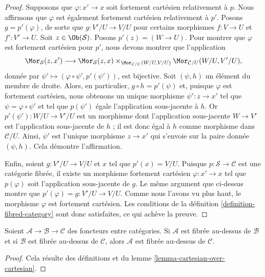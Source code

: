 \begin{proof}
Supposons que $\varphi : x' \to x$ soit fortement cartésien relativement
à $p$. Nous affirmons que $\varphi$ est également fortement cartésien
relativement à $p'$. Posons $g = p'(\varphi)$, de sorte que
$g : V'/U \to V/U$ pour certains morphismes $f : V \to U$ et
$f' : V' \to U$.
Soit $z \in \Ob(\mathcal{S})$. Posons $p'(z) = (W \to U)$.
Pour montrer que $\varphi$ est fortement cartésien pour $p'$, nous devons
montrer que l'application
$$
\Mor_\mathcal{S}(z, x')
\longrightarrow
\Mor_\mathcal{S}(z, x)
\times_{\Mor_{\mathcal{C}/U}(W/U, V/U)}
\Mor_{\mathcal{C}/U}(W/U, V'/U),
$$
donnée par $\psi' \longmapsto (\varphi \circ \psi', p'(\psi'))$,
est bijective. Soit $(\psi, h)$ un élément du membre de droite. Alors, en
particulier, $g \circ h = p'(\psi)$ et, puisque $\varphi$ est fortement
cartésien, nous obtenons un unique morphisme $\psi' : z \to x'$ tel que
$\psi = \varphi \circ \psi'$ et tel que $p(\psi')$ égale l'application
sous-jacente à $h$. Or $p'(\psi') : W/U \to V'/U$ est un morphisme
dont l'application sous-jacente $W \to V'$ est l'application sous-jacente
de $h$ ; il est donc égal à $h$ comme morphisme dans $\mathcal{C}/U$.
Ainsi, $\psi'$ est l'unique morphisme $z \to x'$ qui s'envoie sur la paire
donnée $(\psi, h)$. Cela démontre l'affirmation.

\medskip\noindent
Enfin, soient $g : V'/U \to V/U$ et $x$ tel que $p'(x) = V/U$.
Puisque $p : \mathcal{S} \to \mathcal{C}$ est une catégorie fibrée,
il existe un morphisme fortement cartésien $\varphi : x' \to x$
tel que $p(\varphi)$ soit l'application sous-jacente de $g$.
Le même argument que ci-dessus montre que
$p'(\varphi) = g : V'/U \to V/U$. Comme nous l'avons vu plus haut,
le morphisme $\varphi$ est fortement cartésien. Les conditions de la
définition \ref{definition-fibred-category} sont donc satisfaites, ce qui
achève la preuve.
\end{proof}

\begin{lemma}
\label{lemma-fibred-over-fibred}
Soient $\mathcal{A} \to \mathcal{B} \to \mathcal{C}$ des foncteurs entre
catégories. Si $\mathcal{A}$ est fibrée au-dessus de $\mathcal{B}$ et si
$\mathcal{B}$ est fibrée au-dessus de $\mathcal{C}$, alors $\mathcal{A}$
est fibrée au-dessus de $\mathcal{C}$.
\end{lemma}

\begin{proof}
Cela résulte des définitions et du
lemme \ref{lemma-cartesian-over-cartesian}.
\end{proof}

